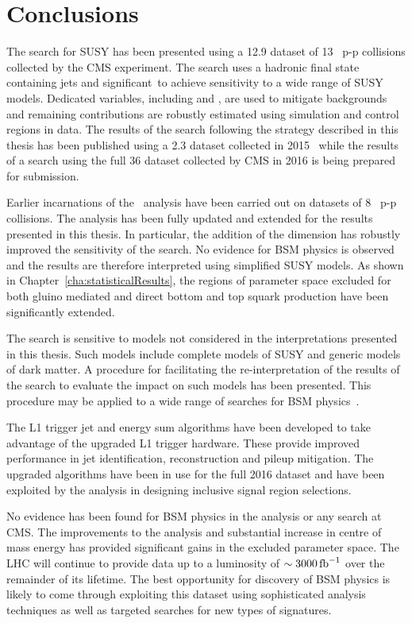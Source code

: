 \chapter{Conclusions}

The \alphat search for SUSY has been presented using a 12.9 \ifb 
dataset of 13 \TeV~p-p collisions collected by the CMS experiment. 
The search uses a hadronic final state containing jets and 
significant~\met to achieve sensitivity to a wide range of SUSY
models. Dedicated variables, including \alphat and \bdphi, are used 
to mitigate backgrounds and remaining contributions
are robustly estimated using simulation and control regions in data.
The results of the \alphat search following the strategy
described in this thesis has been published using 
a 2.3 \ifb dataset collected in 2015~\cite{alphat2015} while the results 
of a search using the full 36 \ifb dataset collected by CMS in 2016 
is being prepared for submission.

Earlier incarnations of the \alphat~analysis have been carried out
on datasets of 8 \TeV~p-p collisions. The analysis has been
fully updated and extended for the results presented in this thesis. 
In particular, the addition of the \mht dimension has robustly improved the sensitivity of the search. 
No evidence for BSM physics is observed and the results are 
therefore interpreted using simplified SUSY models. As shown in Chapter~\ref{cha:statisticalResults},
the regions of parameter space excluded for both gluino mediated 
and direct bottom and top squark production have been 
significantly extended.

The \alphat search is sensitive to models not considered in the
interpretations presented in this thesis. Such models include 
complete models of SUSY and generic models of dark matter. 
A procedure for facilitating the re-interpretation of the results of the search to evaluate the 
impact on such models has been presented. This procedure 
may be applied to a wide range of searches for BSM physics~\cite{simp-lik}.

The L1 trigger jet and energy sum algorithms have been
developed to take advantage of the upgraded L1 trigger hardware.
These provide improved performance in jet identification, 
reconstruction and pileup mitigation. The upgraded algorithms have
been in use for the full 2016 dataset and have been exploited
by the \alphat analysis in designing inclusive signal region selections.

No evidence has been found for BSM physics in the \alphat analysis 
or any search at CMS. The improvements to the analysis and substantial
increase in centre of mass energy has provided significant gains in
the excluded parameter space. The LHC will continue 
to provide data up to a luminosity of $\sim 3000\,\text{fb}^{-1}$ over the 
remainder of its lifetime. The best opportunity for discovery of 
BSM physics is likely to come through exploiting this dataset 
using sophisticated analysis techniques as well as targeted searches 
for new types of signatures.

